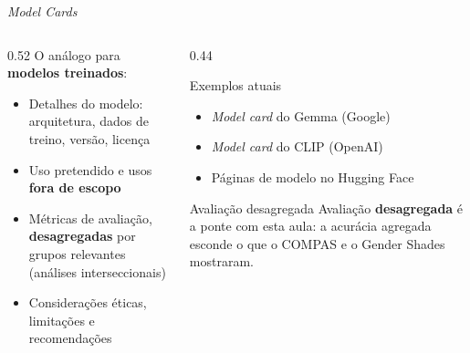 \documentclass[aspectratio=169,xcolor=dvipsnames]{beamer}
\begin{document}
  \begin{frame}{\textit{Model Cards}}
    \begin{columns}[T]
      \begin{column}{0.52\textwidth}
        O análogo para \textbf{modelos treinados}:
        \begin{itemize}\setlength{\itemsep}{0.2em}
          \item Detalhes do modelo: arquitetura, dados de treino, versão, licença
          \item Uso pretendido e usos \textbf{fora de escopo}
          \item Métricas de avaliação, \textbf{desagregadas} por grupos relevantes (análises interseccionais)
          \item Considerações éticas, limitações e recomendações
        \end{itemize}
      \end{column}
      \begin{column}{0.44\textwidth}
        \begin{block}{Exemplos atuais}
          \begin{itemize}\setlength{\itemsep}{0.2em}
            \item \textit{Model card} do Gemma (Google)
            \item \textit{Model card} do CLIP (OpenAI)
            \item Páginas de modelo no Hugging Face
          \end{itemize}
        \end{block}
        \begin{alertblock}{Avaliação desagregada}
          Avaliação \textbf{desagregada} é a ponte com esta aula: a acurácia agregada esconde o que o COMPAS e o Gender Shades mostraram.
        \end{alertblock}
      \end{column}
    \end{columns}
  \end{frame}
\end{document}
